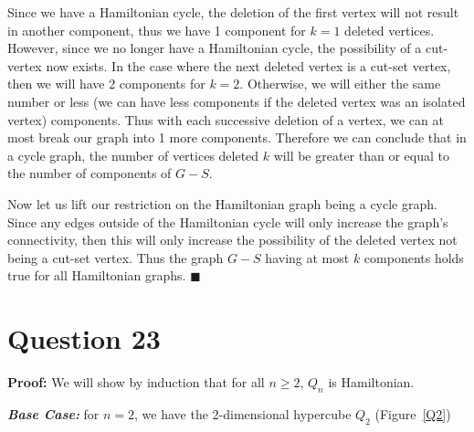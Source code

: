 \documentclass[11pt, oneside]{article}   	%
\newcommand*{\QEDA}{\hfill\ensuremath{\blacksquare}}         %
\begin{document}
{{Since we have a Hamiltonian cycle, the deletion of the first vertex will not result in another component, thus we have 1 component for $k=1$ deleted vertices. However, since we no longer have a Hamiltonian cycle, the possibility of a cut-vertex now exists. In the case where the next deleted vertex is a cut-set vertex, then we will have 2 components for $k=2$. Otherwise, we will either the same number or less (we can have less components if the deleted vertex was an isolated vertex) components. Thus with each successive deletion of a vertex, we can at most break our graph into 1 more components. Therefore we can conclude that in a cycle graph,  the number of vertices deleted $k$ will be greater than or equal to the number of components of $G - S$.

Now let us lift our restriction on the Hamiltonian graph being a cycle graph. Since any edges outside of the Hamiltonian cycle will only increase the graph's connectivity, then this will only increase the possibility of the deleted vertex not being a cut-set vertex. Thus the graph $G-S$ having at most $k$ components holds true for all Hamiltonian graphs. \QEDA


\section*{Question 23}

\textbf{Proof:} We will show by induction that for all $n \geq 2$, $Q_n$ is Hamiltonian.

	\textbf{\textit{Base Case:}} for $n=2$, we have the 2-dimensional hypercube $Q_2$ (Figure~\ref{Q2})
	
	\begin{figure}[h]
            \centering
            
            

\end{figure}}}
\end{document}
